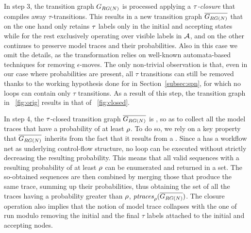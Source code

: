 In step 3, the transition graph $G_{RG(N)}$ is processed applying a \emph{$\tau$-closure} that compiles away
$\tau$-transitions. This results in a new transition graph $\overline{G_{RG(N)}}$ that on the one hand only retains $\tau$ labels only in the initial and accepting states while for the rest exclusively operating over visible labels in $\mathcal{A}$, and on the other continues to preserve model traces and their probabilities. Also in this case we omit the details, as the transformation relies on well-known automata-based techniques for removing $\epsilon$-moves. The only non-trivial observation is that, even in our case where probabilities are present, all $\tau$ transitions can still be removed thanks to the working hypothesis done for  in Section~\ref{subsec:spn}, for which no loops can contain only $\tau$ transitions. As a result of this step, the transition graph in \figurename~\ref{fig:orig} results in that of \figurename~\ref{fig:closed}.


In step 4, the $\tau$-closed transition graph $\overline{G_{RG(N)}}$ is \unravelled, so as to collect all the model traces that have a probability of at least $\rho$. To do so, we rely on a key property that $\overline{G_{RG(N)}}$ inherits from the fact that it results from a \uswn. Since a \uswn has a workflow net as underlying control-flow structure, no loop can be executed without strictly decreasing the resulting probability. This means that all valid sequences with a resulting probability of at least $\rho$ can be enumerated and returned in a set. The so-obtained sequences are then combined by merging those that produce the same trace, summing up their probabilities, thus obtaining the set of all the traces having a probability greater than $\rho$, $\mathit{ptraces}_{\rho}(\overline{G_{RG(N)}})$. The closure operation also implies that the notion of model trace collapses with the one of run modulo removing the initial and the final $\tau$ labels attached to the initial and accepting nodes.


